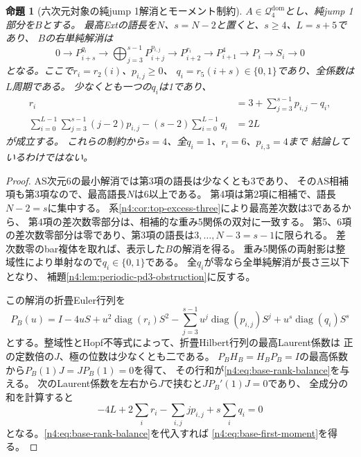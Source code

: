\documentclass[11pt,a4paper]{ltjsarticle}
\newtheorem{proposition}[theorem]{命題}
\theoremstyle{definition}
\begin{document}
\begin{proposition}[六次元対象の純jump 1解消とモーメント制約]
\label{n4:prop:pure-base-numerics}
$A\in\mathcal Q_4^{\mathrm{dom}}$とし、純jump 1部分を$B$とする。
最高Extの語長を$N$、$s=N-2$と置くと、$s\ge4$、$L=s+5$であり、
$B$の右単純解消は
\[
0\longrightarrow P_{i+s}^{q_i}
\longrightarrow\bigoplus_{j=3}^{s-1}P_{i+j}^{p_{i,j}}
\longrightarrow P_{i+2}^{r_i}\longrightarrow P_{i+1}^{4}
\longrightarrow P_i\longrightarrow S_i\longrightarrow0
\]
となる。ここで$r_i=r_2(i)$、$p_{i,j}\ge0$、
$q_i=r_5(i+s)\in\{0,1\}$であり、全係数は$L$周期である。
少なくとも一つの$q_i$は1であり、
\begin{align}
r_i&=3+\sum_{j=3}^{s-1}p_{i,j}-q_i,
\label{n4:eq:base-rank-balance}\\
\sum_{i=0}^{L-1}\sum_{j=3}^{s-1}(j-2)p_{i,j}
 -(s-2)\sum_{i=0}^{L-1}q_i&=2L
\label{n4:eq:base-first-moment}
\end{align}
が成立する。
これらの制約から$s=4$、全$q_i=1$、$r_i=6$、$p_{i,3}=4$まで
結論しているわけではない。
\end{proposition}
\begin{proof}
AS次元6の最小解消では第3項の語長は少なくとも3であり、
そのAS相補項も第3項なので、最高語長$N$は6以上である。
第4項は第2項に相補で、語長$N-2=s$に集中する。
系\ref{n4:cor:top-excess-three}により最高差次数は3であるから、
第4項の差次数零部分は、相補的な重み5関係の双対に一致する。
第5、6項の差次数零部分は零であり、第3項の語長は$3,\ldots,N-3=s-1$に限られる。
差次数零のbar複体を取れば、表示した$B$の解消を得る。
重み5関係の両射影は整域性により単射なので$q_i\in\{0,1\}$である。
全$q_i$が零なら全単純解消が長さ三以下となり、
補題\ref{n4:lem:periodic-pd3-obstruction}に反する。

この解消の折畳Euler行列を
\[
P_B(u)=I-4uS+u^2\operatorname{diag}(r_i)S^2
-\sum_{j=3}^{s-1}u^j\operatorname{diag}(p_{i,j})S^j
+u^s\operatorname{diag}(q_i)S^s
\]
とする。整域性とHopf不等式によって、折畳Hilbert行列の最高Laurent係数は
正の定数倍の$J$、極の位数は少なくとも二である。
$P_BH_B=H_BP_B=I$の最高係数から$P_B(1)J=JP_B(1)=0$を得て、
その行和が\eqref{n4:eq:base-rank-balance}を与える。
次のLaurent係数を左右から$J$で挟むと$JP_B'(1)J=0$であり、
全成分の和を計算すると
\[
-4L+2\sum_i r_i-\sum_{i,j}j p_{i,j}+s\sum_iq_i=0
\]
となる。\eqref{n4:eq:base-rank-balance}を代入すれば
\eqref{n4:eq:base-first-moment}を得る。
\end{proof}
\end{document}
